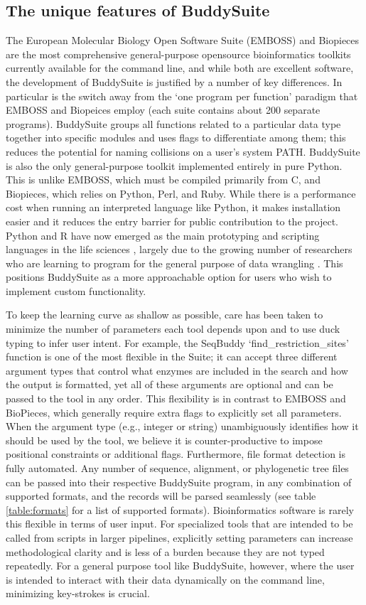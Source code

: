 \documentclass[twocolumn]{bmcart}%
\begin{document}
\subsection*{The unique features of BuddySuite}
The European Molecular Biology Open Software Suite (EMBOSS) and Biopieces are the most comprehensive general-purpose opensource bioinformatics toolkits currently available for the command line, and while both are excellent software, the development of BuddySuite is justified by a number of key differences. In particular is the switch away from the `one program per function' paradigm that EMBOSS and Biopeices employ (each suite contains about 200 separate programs). BuddySuite groups all functions related to a particular data type together into specific modules and uses flags to differentiate among them; this reduces the potential for naming collisions on a user\rq{}s system PATH. BuddySuite is also the only general-purpose toolkit implemented entirely in pure Python. This is unlike EMBOSS, which must be compiled primarily from C, and Biopieces, which relies on Python, Perl, and Ruby. While there is a performance cost when running an interpreted language like Python,  it makes installation easier and it reduces the entry barrier for public contribution to the project. Python and R have now emerged as the main prototyping and scripting languages in the life sciences \cite{Ekmekci:2016co}, largely due to the growing number of researchers who are learning to program for the general purpose of data wrangling \cite{Hannay:2009hv}. This positions BuddySuite as a more approachable option for users who wish to implement custom functionality.

To keep the learning curve as shallow as possible, care has been taken to minimize the number of parameters each tool depends upon and to use duck typing to infer user intent. For example, the SeqBuddy `find\_restriction\_sites' function is one of the most flexible in the Suite; it can accept three different argument types that control what enzymes are included in the search and how the output is formatted, yet all of these arguments are optional and can be passed to the tool in any order. This flexibility is in contrast to EMBOSS and BioPieces, which generally require extra flags to explicitly set all parameters. When the argument type (e.g., integer or string) unambiguously identifies how it should be used by the tool, we believe it is counter-productive to impose positional constraints or additional flags. Furthermore, file format detection is fully automated. Any number of sequence, alignment, or phylogenetic tree files can be passed into their respective BuddySuite program, in any combination of supported formats, and the records will be parsed seamlessly (see table \ref{table:formats} for a list of supported formats). Bioinformatics software is rarely this flexible in terms of user input. For specialized tools that are intended to be called from scripts in larger pipelines, explicitly setting parameters can increase methodological clarity and is less of a burden because they are not typed repeatedly. For a general purpose tool like BuddySuite, however, where the user is intended to interact with their data dynamically on the command line, minimizing key-strokes is crucial.
\end{document}
